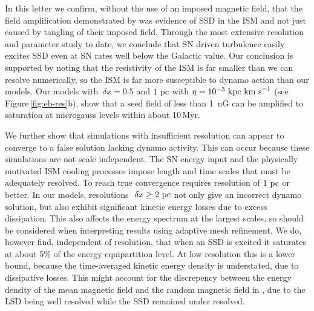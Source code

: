 \documentclass[preprint2]{aastex63}
\newcommand\kpc{~ {\rm kpc}}
\newcommand\pc{~ {\rm pc}}
\newcommand\dx{~ {\delta x}}
\newcommand\kms{~ {\rm km~ s}^{-1}}
\begin{document}
In this letter we confirm, without the use of an imposed magnetic field, that
the field amplification demonstrated by \citet{BKMM04} was evidence of SSD in
the ISM and not just caused by tangling of their imposed field.
Through the most extensive resolution and parameter study to date, we conclude
that SN driven turbulence easily excites SSD even at SN rates well below the
Galactic value.
Our conclusion is supported by noting that the resistivity of the ISM is far
smaller than we can resolve numerically, so the ISM is far more susceptible to
dynamo action than our models.
Our models with $\dx=0.5$ and $1\pc$ with $\eta=10^{-3}\kpc\kms$ (see
Figure\,\ref{fig:eb-res}b), show that a seed field of less than 1~nG can be
amplified to saturation at microgauss levels within about 10\,Myr.

We further show that simulations with insufficient resolution can appear to
converge to a false solution lacking dynamo activity. This can occur because
these simulations are not scale independent.
The SN energy input and the physically motivated ISM cooling processes impose
length and time scales that must be adequately resolved.
To reach true convergence requires resolution of $1\pc$ or better.
In our models, resolutions $\dx\geq2\pc$ not only give an incorrect dynamo
solution, but also exhibit significant kinetic energy losses due to excess
dissipation.
This also affects the energy spectrum at the largest scales, so should be 
considered when interpreting results using adaptive mesh refinement.
%
We do, however find, independent of resolution, that when an SSD is excited it
saturates at about 5\% of the energy equipartition level.
At low resolution this is a lower bound, because the time-averaged kinetic
energy density is understated, due to dissipative losses.
This might account for the discrepency between the energy density of the mean
magnetic field and the random magnetic field in \citet{Gent:2013b}, due to the
LSD being well resolved while the SSD remained under resolved.
\end{document}
